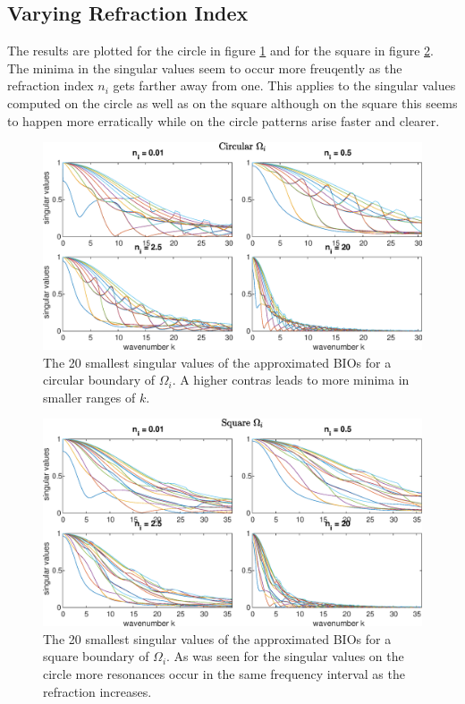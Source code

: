 \documentclass[a4paper, oneside]{thirdparty_stylesheets/discothesis}
\begin{document}
\subsection{Varying Refraction Index}
The results are plotted for the circle in figure \ref{fig:SVs_circle_refraction} and for the square in figure \ref{fig:SVs_square_refraction}. 
The minima in the singular values seem to occur more freuqently as the refraction index $n_i$ gets farther away from one.
This applies to the singular values computed on the circle as well as on the square although on the square this seems to happen more erratically while on the circle patterns arise faster and clearer.
\begin{figure} [H]
	\centering
	\includegraphics[width=\columnwidth]{figures/SVs_circle_refraction.eps}
	\caption{
		The 20 smallest singular values of the approximated BIOs for a circular boundary of $\Omega_i$. 
		A higher contras leads to more minima in smaller ranges of $k$.
	}
	\label{fig:SVs_circle_refraction}
\end{figure}
\begin{figure} [H]
	\centering
	\includegraphics[width=\columnwidth]{figures/SVs_square_refraction.eps}
	\caption{ 
		The 20 smallest singular values of the approximated BIOs for a square boundary of $\Omega_i$.
		As was seen for the singular values on the circle more resonances occur in the same frequency interval as the refraction increases.
	}
	\label{fig:SVs_square_refraction}
\end{figure}
\newpage
\end{document}
